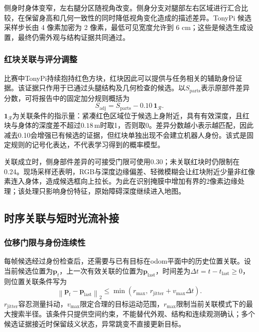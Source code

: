 侧身时身体变窄，左右腿分区随视角改变。侧身分支对腿部左右区域进行汇合比较，在保留身高和几何一致性的同时降低视角变化造成的描述差异。TonyPi 候选采样步长由 4 像素加密为 2 像素，最低可见宽度允许到 6 cm；这些是候选生成设置，最终仍需外观与结构证据共同通过。
\subsubsection{红块关联与评分调整}
比赛中TonyPi持续抱持红色方块，红块因此可以提供与任务相关的辅助身份证据。该证据只作用于已通过头腿结构及几何检查的候选。以$S_{\mathrm{parts}}$表示原部件差异分数，可将报告中的固定加分规则概括为
\begin{equation}\label{eq:f3-red-score}
S_{\mathrm{adj}}=S_{\mathrm{parts}}-0.10\,\mathbf 1_{\mathcal R}.
\end{equation}
$\mathbf 1_{\mathcal R}$为关联条件的指示量：紧凑红色区域位于候选上身附近，具有有效深度，且红块与身体的深度差不超过$0.18\,\mathrm m$时取1，否则取0。差异分数越小表示越匹配，因此减去0.10会增强已有候选的证据，但红块单独出现不会建立机器人身份。该式是固定规则的记号化表达，不代表学习得到的概率模型。

关联成立时，侧身部件差异的可接受门限可使用0.30；未关联红块时仍限制在0.24。现场采样还表明，RGB与深度边缘偏差、轻微模糊会让红块附近少量非红像素连入身体，造成候选框向上拉长。为此在识别掩膜中增加有界的2像素边缘处理；该处理只影响身份特征，原始障碍深度继续进入地图。




\FloatBarrier
{}
\subsection{时序关联与短时光流补接}\label{sec:f3-tracking}
\subsubsection{位移门限与身份连续性}
每帧候选经过身份检查后，还需要与已有目标在odom平面中的历史位置关联。设当前候选位置为$\mathbf p_t$，上一次有效关联的位置为$\mathbf p_{\mathrm{last}}$，时间差为$\Delta t=t-t_{\mathrm{last}}\geq0$，则位置关联条件写为
\begin{equation}\label{eq:f3-association}
\left\|\mathbf p_t-\mathbf p_{\mathrm{last}}\right\|_2
\leq \min\!\left(r_{\max},\,r_{\mathrm{jitter}}+v_{\max}\Delta t\right).
\end{equation}
$r_{\mathrm{jitter}}$容忍测量抖动，$v_{\max}$限定合理的目标运动范围，$r_{\max}$限制当前关联模式下的最大搜索半径。该条件只提供空间约束，不能替代外观、结构和连续观测确认；多个候选证据接近时保留歧义状态，异常跳变不直接更新目标。

